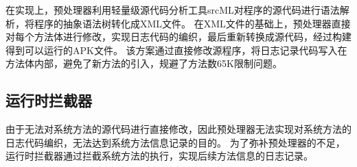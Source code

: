 在实现上，预处理器利用轻量级源代码分析工具srcML\cite{collard2013srcml}对程序的源代码进行语法解析，将程序的抽象语法树转化成XML文件。
在XML文件的基础上，预处理器直接对每个方法体进行修改，实现日志代码的编织，最后重新转换成源代码，经过构建得到可以运行的APK文件。
该方案通过直接修改源程序，将日志记录代码写入在方法体内部，避免了新方法的引入，规避了方法数65K限制问题。


\subsection{运行时拦截器}%

由于无法对系统方法的源代码进行直接修改，因此预处理器无法实现对系统方法的日志代码编织，无法达到系统方法信息记录的目的。
为了弥补预处理器的不足，运行时拦截器通过拦截系统方法的执行，实现后续方法信息的日志记录。







